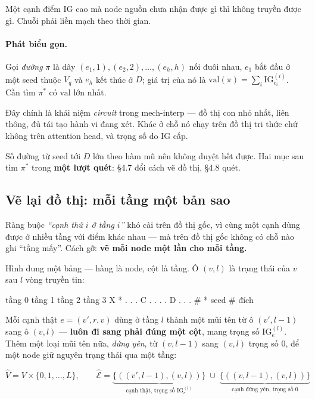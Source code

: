 \documentclass[11pt,a4paper]{article}
\begin{document}
Một cạnh điểm IG cao mà node nguồn chưa nhận được gì thì không truyền được gì. Chuỗi phải
liền mạch theo thời gian.

\paragraph{Phát biểu gọn.} Gọi \emph{đường} $\pi$ là dãy $(e_1,1),(e_2,2),\dots,(e_h,h)$ nối
đuôi nhau, $e_1$ bắt đầu ở một seed thuộc $V_q$ và $e_h$ kết thúc ở $D$; giá trị của nó là
$\mathrm{val}(\pi)=\sum_i \mathrm{IG}_{e_i}^{(i)}$. Cần tìm $\pi^*$ có $\mathrm{val}$ lớn
nhất.

Đây chính là khái niệm \emph{circuit} trong mech-interp --- đồ thị con nhỏ nhất, liên thông,
đủ tái tạo hành vi đang xét. Khác ở chỗ nó chạy trên đồ thị tri thức chứ không trên attention
head, và trọng số do IG cấp.

Số đường từ seed tới $D$ lớn theo hàm mũ nên không duyệt hết được. Hai mục sau tìm $\pi^*$
trong \textbf{một lượt quét}: \S4.7 đổi cách vẽ đồ thị, \S4.8 quét.

\subsection{Vẽ lại đồ thị: mỗi tầng một bản sao}

Ràng buộc \emph{``cạnh thứ $i$ ở tầng $i$''} khó cài trên đồ thị gốc, vì cùng một cạnh dùng
được ở nhiều tầng với điểm khác nhau --- mà trên đồ thị gốc không có chỗ nào ghi ``tầng
mấy''. Cách gỡ: \textbf{vẽ mỗi node một lần cho mỗi tầng.}

Hình dung một bảng --- hàng là node, cột là tầng. Ô $(v,l)$ là trạng thái của $v$ sau $l$
vòng truyền tin:

\begin{dia}
             tầng 0     tầng 1     tầng 2     tầng 3
    X          *          .          .          .
    C          .          .          .          .
    D          .          .          .          #
             * seed                            # đích
\end{dia}

Mỗi cạnh thật $e=(v',r,v)$ dùng ở tầng $l$ thành một mũi tên từ ô $(v',l-1)$ sang ô $(v,l)$
--- \textbf{luôn đi sang phải đúng một cột}, mang trọng số $\mathrm{IG}_e^{(l)}$. Thêm một
loại mũi tên nữa, \emph{đứng yên}, từ $(v,l-1)$ sang $(v,l)$ trọng số 0, để một node giữ
nguyên trạng thái qua một tầng:

\[ \widehat V = V\times\{0,1,\dots,L\}, \qquad
   \widehat{\mathcal{E}} = \underbrace{\{((v',l-1),(v,l))\}}_{\text{cạnh thật, trọng số } \mathrm{IG}_e^{(l)}}
   \;\cup\; \underbrace{\{((v,l-1),(v,l))\}}_{\text{cạnh đứng yên, trọng số }0} \]
\end{document}
